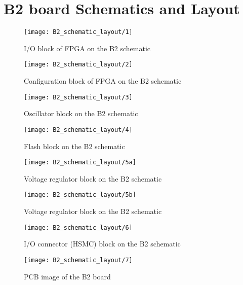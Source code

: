 \chapter{B2 board Schematics and Layout}

\begin{figure}
 \centering
 \texttt{[image: B2\_schematic\_layout/1]}
 \caption{I/O block of FPGA on the B2 schematic}
 \label{fig:b2_sch_lo_1}
\end{figure}

\begin{figure}
 \centering
 \texttt{[image: B2\_schematic\_layout/2]}
 \caption{Configuration block of FPGA on the B2 schematic}
 \label{fig:b2_sch_lo_2}
\end{figure}

\begin{figure}
 \centering
 \texttt{[image: B2\_schematic\_layout/3]}
 \caption{Oscillator block on the B2 schematic}
 \label{fig:b2_sch_lo_3}
\end{figure}

\begin{figure}
 \centering
 \texttt{[image: B2\_schematic\_layout/4]}
 \caption{Flash block on the B2 schematic}
 \label{fig:b2_sch_lo_4}
\end{figure}

\begin{figure}
 \centering
 \texttt{[image: B2\_schematic\_layout/5a]}
 \caption{Voltage regulator block on the B2 schematic}
 \label{fig:b2_sch_lo_5a}
\end{figure}

\begin{figure}
 \centering
 \texttt{[image: B2\_schematic\_layout/5b]}
 \caption{Voltage regulator block on the B2 schematic}
 \label{fig:b2_sch_lo_5b}
\end{figure}

\begin{figure}
 \centering
 \texttt{[image: B2\_schematic\_layout/6]}
 \caption{I/O connector (HSMC) block on the B2 schematic}
 \label{fig:b2_sch_lo_6}
\end{figure}

\begin{figure}
 \centering
 \texttt{[image: B2\_schematic\_layout/7]}
 \caption{PCB image of the B2 board}
 \label{fig:b2_sch_lo_7}
\end{figure}